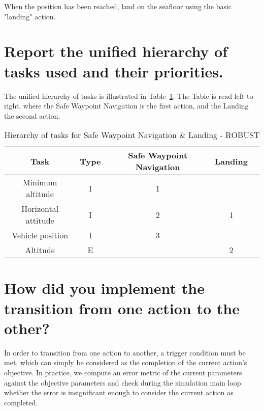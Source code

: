 	When the position has been reached, land on the seafloor using the basic
	"landing" action.
	\begin{parts}
		\part{Report the unified hierarchy of tasks used and their
		priorities.}

		\begin{solutionorbox}
			The unified hierarchy of tasks is illustrated in
			Table~\ref{table:tkip_swn_landing_robust}. The Table is read
			left to right, where the Safe Waypoint Navigation is the
			first action, and the Landing the second action.
		\end{solutionorbox}

		\begin{table}[htb]
			\caption{Hierarchy of tasks for Safe Waypoint Navigation
			\& Landing - ROBUST}
			\label{table:tkip_swn_landing_robust}
			\begin{center}
				\footnotesize
				\begin{tabular}{ccccc}
					\toprule
					Task & Type & Safe Waypoint Navigation & Landing
					\\
					\midrule
					Minimum altitude & I & 1 & \\
					\hdashline
					Horizontal attitude & I & 2 & 1\\
					\hdashline
					Vehicle position & I & 3 & \\
					\hdashline
					Altitude & E &  & 2\\
					\bottomrule
				\end{tabular}
			\end{center}
		\end{table}%
		\part{How did you implement the transition from one action to the
		other?}

		\begin{solutionorbox}
			In order to transition from one action to another, a
			trigger condition must be met, which can simply be
			considered as the completion of the current action's
			objective. In practice, we compute an error metric
			of the current parameters against the objective
			parameters and check during the simulation main loop
			whether the error is insignificant enough to consider
			the current action as completed.


\end{solutionorbox}
\end{parts}
